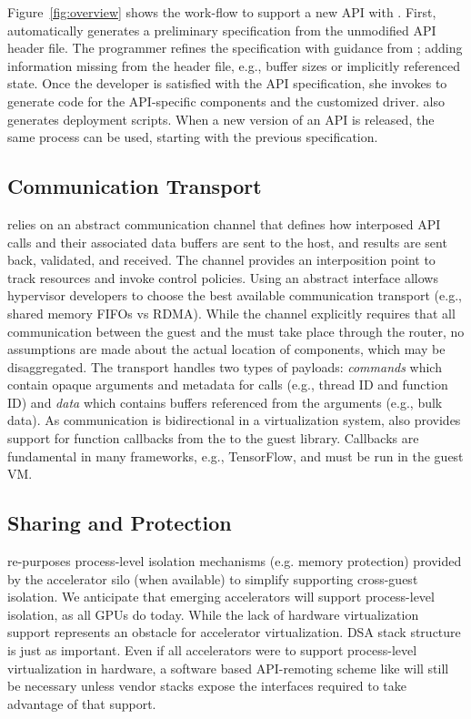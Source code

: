 Figure~\ref{fig:overview} shows the work-flow to support a new API with \AvA.
First, \CAvA automatically generates a preliminary \Lapis specification from
the unmodified API header file. The programmer refines the specification with
guidance from \CAvA; adding information missing from the header file, e.g.,
buffer sizes or implicitly referenced state. Once the developer is satisfied
with the API specification, she invokes \CAvA to generate code for the
API-specific components and the customized driver. \CAvA also generates
deployment scripts. When a new version of an API is released, the same process
can be used, starting with the previous specification.

\subsection{Communication Transport}
\label{s:design_transport}

\AvA relies on an abstract communication channel that defines how interposed
API calls and their associated data buffers are sent to the host, and results
are sent back, validated, and received. The channel provides an interposition
point to track resources and invoke control policies. Using an abstract
interface allows hypervisor developers to choose the best available
communication transport (e.g., shared memory FIFOs vs RDMA). While the channel
explicitly requires that all communication between the guest and the \worker
must take place through the router, no assumptions are made about the actual
location of components, which may be disaggregated.
The transport handles two types of payloads: \emph{commands} which contain
opaque arguments and metadata for calls (e.g., thread ID and function ID) and
\emph{data} which contains buffers referenced from the arguments (e.g., bulk
data). As communication is bidirectional in a virtualization system, \AvA also
provides support for function callbacks from the \worker to the guest library.
Callbacks are fundamental in many frameworks, e.g., TensorFlow, and must be
run in the guest VM.

\subsection{Sharing and Protection}
\label{s:protection}

\AvA re-purposes process-level isolation mechanisms (e.g. memory protection)
provided by the accelerator silo (when available) to simplify supporting
cross-guest isolation. We anticipate that emerging accelerators will support
process-level isolation, as all GPUs do today. While the lack of hardware
virtualization support represents an obstacle for accelerator virtualization.
DSA stack structure is just as important. Even if all accelerators were to
support process-level virtualization in hardware, a software based
API-remoting scheme like \AvA will still be necessary unless vendor stacks
expose the interfaces required to take advantage of that support.

